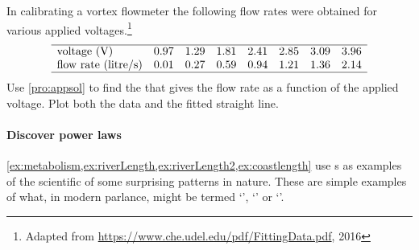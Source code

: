 \begin{reduce}
\begin{exercise}  
In calibrating a vortex flowmeter the following flow rates were obtained for various applied voltages.\footnote{Adapted from \url{https://www.che.udel.edu/pdf/FittingData.pdf}, 2016}
\setbox\ajrqrbox\hbox{}%
\marginajrbox%
\begin{equation*}
\begin{array}{lrrrrrrrr}\hline
\text{voltage (V)}&0.97&1.29&1.81&2.41&2.85&3.09&3.96\\
\text{flow rate (litre/s)}&0.01&0.27&0.59&0.94&1.21&1.36&2.14\\\hline
\end{array}
\end{equation*}
Use \cref{pro:appsol} to find the  that gives the flow rate as a function of the applied voltage.
Plot both the data and the fitted straight line.
\end{exercise}
\end{reduce}





\paragraph{Discover power laws}
\cref{ex:metabolism,ex:riverLength,ex:riverLength2,ex:coastlength} use s as examples of the scientific  of some surprising patterns in nature.  
These are simple examples of what, in modern parlance, might be termed `', `' or `'.

